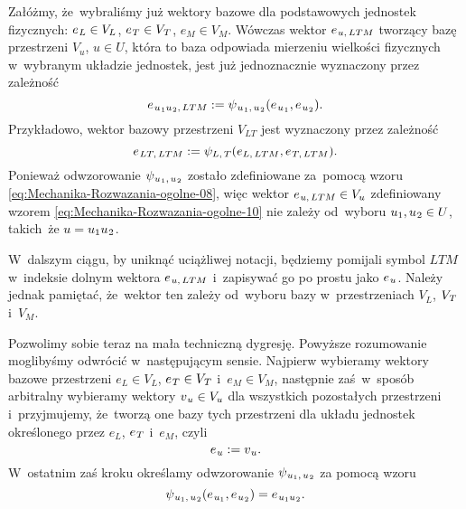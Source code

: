 \documentclass[a4paper,11pt]{article}
\numberwithin{equation}{section}
\begin{document}
Załóżmy, że~wybraliśmy już wektory bazowe dla podstawowych jednostek
fizycznych: $e_{ \hspace{0.05em} L } \in V_{ L }$,
$e_{ \hspace{0.05em} T } \in V_{ \hspace{0.05em} T }$, $e_{ M } \in V_{ M }$.
Wówczas wektor $e_{ \hspace{0.05em} u, \, LTM }$ tworzący bazę przestrzeni
$V_{ u }$, $u \in U$, która to baza odpowiada mierzeniu wielkości fizycznych
w~wybranym układzie jednostek, jest już jednoznacznie wyznaczony przez
zależność
\begin{equation}
  \label{eq:Mechanika-Rozwazania-ogolne-10}
  e_{ \hspace{0.07em} u_{ \hspace{0.05em} 1 } u_{ \hspace{0.05em} 2 }, \, LTM } :=
  \psi_{ \hspace{0.07em} u_{ \hspace{0.05em} 1 }, \, u_{ \hspace{0.05em} 2 } }(
  e_{ \hspace{0.07em} u_{ \hspace{0.05em} 1 } }, e_{ \hspace{0.07em} u_{  \hspace{0.05em} 2 } } ).
\end{equation}
Przykładowo, wektor bazowy przestrzeni $V_{ L T }$ jest wyznaczony przez
zależność
\begin{equation}
  \label{eq:Mechanika-Rozwazania-ogolne-11}
  e_{ \hspace{0.05em} L T, \, LTM } :=
  \psi_{ L, \, T }( e_{ L, \, LTM }, e_{ \hspace{0.05em} T, \, LTM } ).
\end{equation}
Ponieważ odwzorowanie
$\psi_{ \hspace{0.05em} u_{ \hspace{0.05em} 1 }, \, u_{ \hspace{0.05em} 2 } }$ zostało zdefiniowane
za~pomocą wzoru \eqref{eq:Mechanika-Rozwazania-ogolne-08}, więc wektor
$e_{ \hspace{0.05em} u, \, LTM } \in V_{ u }$ zdefiniowany wzorem
\eqref{eq:Mechanika-Rozwazania-ogolne-10} nie zależy od~wyboru
$u_{ 1 }, u_{ \hspace{0.05em} 2 } \in U$, takich~że
$u = u_{ 1 } u_{ \hspace{0.05em} 2 }$.

W~dalszym ciągu, by uniknąć uciążliwej notacji, będziemy pomijali symbol
$LTM$ w~indeksie dolnym wektora $e_{ \hspace{0.07em} u, \, LTM }$ i~zapisywać
go po prostu jako $e_{ \hspace{0.07em} u }$. Należy jednak pamiętać, że~wektor
ten zależy od~wyboru bazy w~przestrzeniach $V_{ L }$,
$V_{ \hspace{0.05em} T }$ i~$V_{ M }$.

Pozwolimy sobie teraz na mała techniczną dygresję. Powyższe rozumowanie
moglibyśmy odwrócić w~następującym sensie. Najpierw wybieramy wektory
bazowe przestrzeni $e_{ L } \in V_{ L }$,
$e_{ \hspace{0.05em} T } \in V_{ \hspace{0.05em} T }$
i~$e_{ M } \in V_{ M }$, następnie zaś~w~sposób arbitralny wybieramy wektory
$v_{ \hspace{0.05em} u } \in V_{ u }$ dla wszystkich pozostałych przestrzeni
i~przyjmujemy, że~tworzą one bazy tych przestrzeni dla układu jednostek
określonego przez $e_{ L }$, $e_{ \hspace{0.05em} T }$ i~$e_{ M }$, czyli
\begin{equation}
  \label{eq:Mechanika-Rozwazania-ogolne-12}
  e_{ \hspace{0.05em} u } := v_{ \hspace{0.05em} u }.
\end{equation}
W~ostatnim zaś kroku określamy odwzorowanie
$\psi_{ \hspace{0.05em} u_{ 1 }, \, u_{ \hspace{0.05em} 2 } }$ za pomocą wzoru
\begin{equation}
  \label{eq:Mechanika-Rozwazania-ogolne-13}
  \psi_{ \hspace{0.05em} u_{ 1 }, \, u_{ \hspace{0.05em} 2 } }(
  e_{ \hspace{0.07em} u_{ 1 } }, e_{ \hspace{0.07em} u_{ \hspace{0.05em} 2 } } ) =
  e_{ \hspace{0.07em} u_{ 1 } u_{ \hspace{0.05em} 2 } }.
\end{equation}
\end{document}
